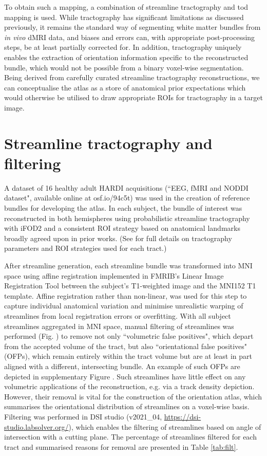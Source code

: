 To obtain such a mapping, a combination of streamline tractography and \gls{tod} mapping \autocite{Dhollander2014} is used.
While tractography has significant limitations as discussed previously, it remains the standard way of segmenting white matter bundles from \textit{in vivo} dMRI data, and biases and errors can, with appropriate post-processing steps, be at least partially corrected for.
In addition, tractography uniquely enables the extraction of orientation information specific to the reconstructed bundle, which would not be possible from a binary voxel-wise segmentation.
Being derived from carefully curated streamline tractography reconstructions, we can conceptualise the atlas as a store of anatomical prior expectations which would otherwise be utilised to draw appropriate ROIs for tractography in a target image.

\section{Streamline tractography and filtering}

A dataset of 16 healthy adult HARDI acquisitions (``EEG, fMRI and NODDI dataset",\autocite{Clayden2020} available online at osf.io/94c5t) was used in the creation of reference bundles for developing the atlas.
In each subject, the bundle of interest was reconstructed in both hemispheres using probabilistic streamline tractography with iFOD2 \autocite{Tournier2010} and a consistent ROI strategy based on anatomical landmarks broadly agreed upon in prior works. (See  for full details on tractography parameters and ROI strategies used for each tract.)


After streamline generation, each streamline bundle was transformed into MNI space using affine registration implemented in FMRIB's Linear Image Registration Tool\autocite{Jenkinson2002} between the subject's T1-weighted image and the MNI152 T1 template.\autocite{Fonov2011}
Affine registration rather than non-linear, was used for this step to capture individual anatomical variation and minimise unrealistic warping of streamlines from local registration errors or overfitting.
With all subject streamlines aggregated in MNI space, manual filtering of streamlines was performed (Fig. ) to remove not only ``volumetric false positives", which depart from the accepted volume of the tract, but also ``orientational false positives" (OFPs), which remain entirely within the tract volume but are at least in part aligned with a different, intersecting bundle.
An example of such OFPs are depicted in supplementary Figure . Such streamlines have little effect on any volumetric applications of the reconstruction, e.g. via a track density depiction.
However, their removal is vital for the construction of the orientation atlas, which summarises the orientational distribution of streamlines on a voxel-wise basis.
Filtering was performed in DSI studio (v2021\_04, \url{https://dsi-studio.labsolver.org/})\autocite{Yeh2021a}, which enables the filtering of streamlines based on angle of intersection with a cutting plane.
The percentage of streamlines filtered for each tract and summarised reasons for removal are presented in Table \ref{tab:filt}.

